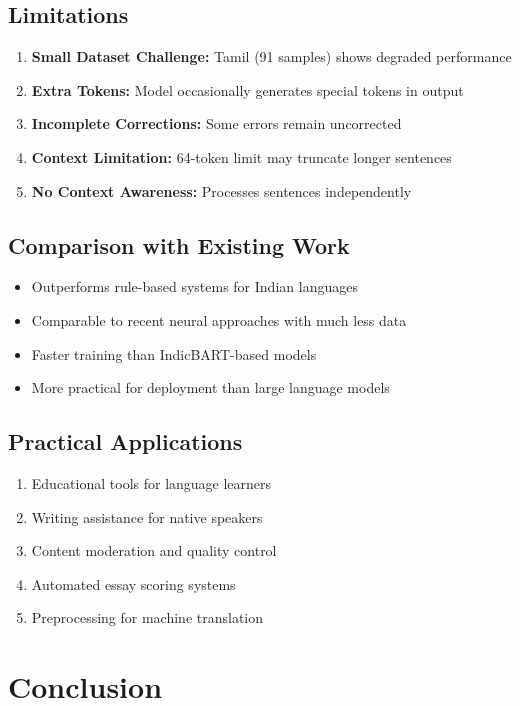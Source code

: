 \documentclass[12pt,a4paper]{article}
\begin{document}
\subsection{Limitations}
\begin{enumerate}
    \item \textbf{Small Dataset Challenge:} Tamil (91 samples) shows degraded performance
    \item \textbf{Extra Tokens:} Model occasionally generates special tokens in output
    \item \textbf{Incomplete Corrections:} Some errors remain uncorrected
    \item \textbf{Context Limitation:} 64-token limit may truncate longer sentences
    \item \textbf{No Context Awareness:} Processes sentences independently
\end{enumerate}

\subsection{Comparison with Existing Work}
\begin{itemize}
    \item Outperforms rule-based systems for Indian languages
    \item Comparable to recent neural approaches with much less data
    \item Faster training than IndicBART-based models
    \item More practical for deployment than large language models
\end{itemize}

\subsection{Practical Applications}
\begin{enumerate}
    \item Educational tools for language learners
    \item Writing assistance for native speakers
    \item Content moderation and quality control
    \item Automated essay scoring systems
    \item Preprocessing for machine translation
\end{enumerate}

\newpage

\section{Conclusion}
\end{document}
